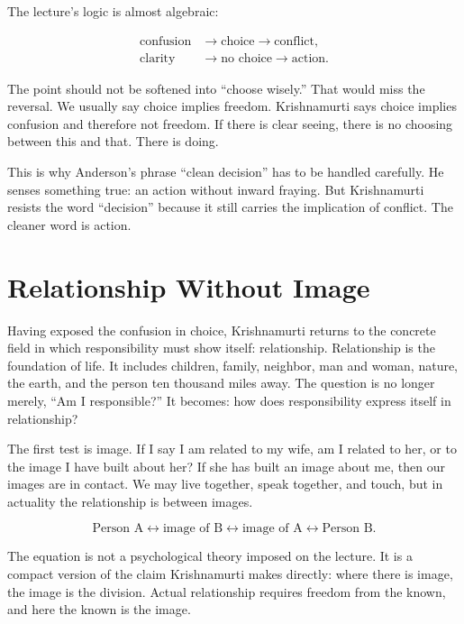 The lecture's logic is almost algebraic:

\begin{align}
\text{confusion}
&\longrightarrow \text{choice}
\longrightarrow \text{conflict}, \\
\text{clarity}
&\longrightarrow \text{no choice}
\longrightarrow \text{action}.
\end{align}

The point should not be softened into ``choose wisely.'' That would miss the reversal. We usually say choice implies freedom. Krishnamurti says choice implies confusion and therefore not freedom. If there is clear seeing, there is no choosing between this and that. There is doing.

This is why Anderson's phrase ``clean decision'' has to be handled carefully. He senses something true: an action without inward fraying. But Krishnamurti resists the word ``decision'' because it still carries the implication of conflict. The cleaner word is action.

\section{Relationship Without Image}

Having exposed the confusion in choice, Krishnamurti returns to the concrete field in which responsibility must show itself: relationship. Relationship is the foundation of life. It includes children, family, neighbor, man and woman, nature, the earth, and the person ten thousand miles away. The question is no longer merely, ``Am I responsible?'' It becomes: how does responsibility express itself in relationship?

The first test is image. If I say I am related to my wife, am I related to her, or to the image I have built about her? If she has built an image about me, then our images are in contact. We may live together, speak together, and touch, but in actuality the relationship is between images.

\begin{equation}
\text{Person A}
\leftrightarrow
\text{image of B}
\leftrightarrow
\text{image of A}
\leftrightarrow
\text{Person B}.
\end{equation}

The equation is not a psychological theory imposed on the lecture. It is a compact version of the claim Krishnamurti makes directly: where there is image, the image is the division. Actual relationship requires freedom from the known, and here the known is the image.

